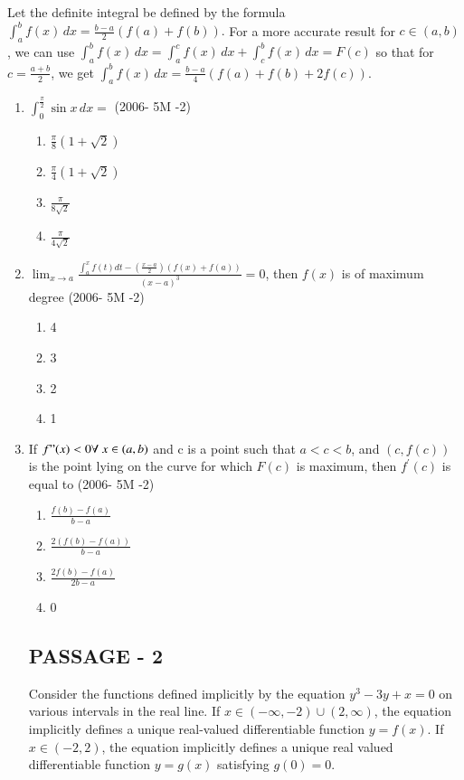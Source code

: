 \documentclass[journal,12pt,onecolumn]{IEEEtran}
\theoremstyle{remark}
\begin{document}
Let the definite integral be defined by the formula
$\int_a^b f(x) \, dx = \frac{b-a}{2} ( f(a) + f(b) ).$
For a more accurate result for $ c \in (a, b) $, we can use
$\int_a^b f(x) \, dx = \int_a^c f(x) \, dx + \int_c^b f(x) \, dx = F(c)$
so that for \( c = \frac{a+b}{2} \), we get
$\int_a^b f(x) \, dx = \frac{b-a}{4}( f(a) + f(b) + 2f(c) )$.
\begin{enumerate}
\item $\int_0^{\frac{\pi}{2}} \sin x \, dx =$
\hfill{(2006- 5M -2)}
\begin{enumerate}
    \item $ \frac{\pi}{8} ( 1 + \sqrt{2} ) $
    \item $\frac{\pi}{4} ( 1 + \sqrt{2} ) $
    \item $ \frac{\pi}{8\sqrt{2}}$
    \item  $\frac{\pi}{4\sqrt{2}}$ 
\end{enumerate}
\item $\lim_{x \to a} \frac{\int_a^x f(t)dt - (\frac{x-a}{2})(f(x) + f(a))}{(x - a)^3} = 0 $, then  $f(x)$  is 
 of maximum degree 
 \hfill{(2006- 5M -2)}
 \begin{enumerate}[label=(\alph*)]
    \item  4 
    \item  3 
    \item  2 
    \item  1
  \end{enumerate}
 \item If $ f"(x) < 0  \forall \ x \in (a, b) $ and  c  is a point such that $a < c < b $, and $(c, f(c))$ is the point lying on the curve for which $F(c)$ is maximum, then $f^{\prime}(c)$ is equal to
 \hfill{(2006- 5M -2)}
 \begin{enumerate}[label=(\alph*)]
    \item  $\frac{f(b) - f(a)}{b - a} $
    \item  $ \frac{2(f(b) - f(a))}{b - a} $
    \item  $ \frac{2f(b) - f(a)}{2b - a} $
    \item  0
\end{enumerate}
\subsection{PASSAGE - 2}
 
 Consider the functions defined implicitly by the equation 
$y^3 - 3y + x = 0$
on various intervals in the real line. If $ x \in (-\infty, -2) \cup (2, \infty) $, the equation implicitly defines a unique real-valued differentiable function $ y = f(x) $. If $x \in (-2, 2)$, the equation implicitly defines a unique real valued differentiable function $y = g(x)$ satisfying $ g(0) = 0$.


\end{enumerate}
\end{document}
